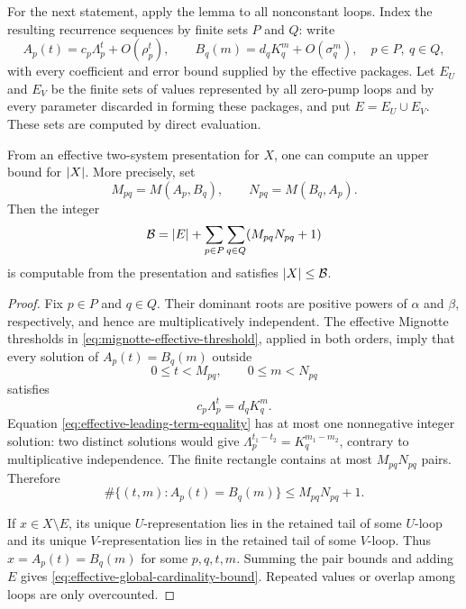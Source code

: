 For the next statement, apply the lemma to all nonconstant loops. Index the
resulting recurrence sequences by finite sets \(P\) and \(Q\): write
\[
  A_p(t)=c_p\Lambda_p^t+O(\rho_p^t),\qquad
  B_q(m)=d_qK_q^m+O(\sigma_q^m),
  \quad p\in P,\ q\in Q,
\]
with every coefficient and error bound supplied by the effective packages.
Let \(E_U\) and \(E_V\) be the finite sets of values represented by all
zero-pump loops and by every parameter discarded in forming these packages,
and put \(E=E_U\cup E_V\). These sets are computed by direct evaluation.

\begin{theorem}
  \label{thm:effective-slender-cfl-cardinality}
  From an effective two-system presentation for \(X\), one can compute an
  upper bound for \(\lvert X \rvert\). More precisely, set
  \[
    M_{pq}=M(A_p,B_q),\qquad N_{pq}=M(B_q,A_p).
  \]
  Then the integer
  \begin{equation}
    \mathcal B=\lvert E \rvert+
      \sum_{p\in P}\sum_{q\in Q}(M_{pq}N_{pq}+1)
    \label{eq:effective-global-cardinality-bound}
  \end{equation}
  is computable from the presentation and satisfies \(\lvert X \rvert\le\mathcal B\).
\end{theorem}

\begin{proof}
  Fix \(p\in P\) and \(q\in Q\). Their dominant roots are positive powers
  of \(\alpha\) and \(\beta\), respectively, and hence are
  multiplicatively independent. The effective Mignotte thresholds in
  \eqref{eq:mignotte-effective-threshold}, applied in both orders, imply that
  every solution of \(A_p(t)=B_q(m)\) outside
  \[
    0\le t<M_{pq},\qquad 0\le m<N_{pq}
  \]
  satisfies
  \begin{equation}
    c_p\Lambda_p^t=d_qK_q^m.
    \label{eq:effective-leading-term-equality}
  \end{equation}
  Equation \eqref{eq:effective-leading-term-equality} has at most one
  nonnegative integer solution: two distinct solutions would give
  \(
    \Lambda_p^{t_1-t_2}=K_q^{m_1-m_2}
  \), contrary to multiplicative independence. The finite rectangle contains
  at most \(M_{pq}N_{pq}\) pairs. Therefore
  \[
    \#\{(t,m):A_p(t)=B_q(m)\}\le M_{pq}N_{pq}+1.
  \]

  If \(x\in X\setminus E\), its unique \(U\)-representation lies in the
  retained tail of some \(U\)-loop and its unique \(V\)-representation lies
  in the retained tail of some \(V\)-loop. Thus \(x=A_p(t)=B_q(m)\) for some
  \(p,q,t,m\). Summing the pair bounds and adding \(E\) gives
  \eqref{eq:effective-global-cardinality-bound}. Repeated values or overlap
  among loops are only overcounted.
\end{proof}

